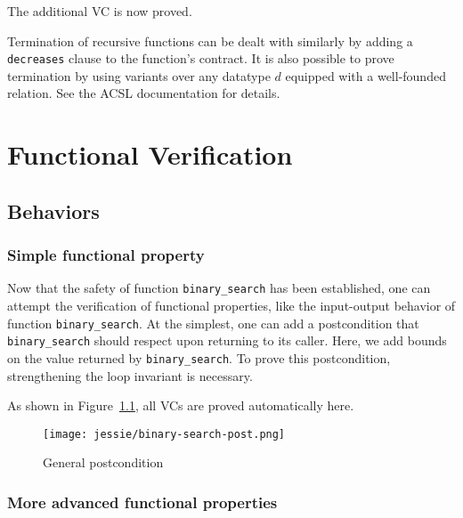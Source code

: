 \documentclass[a4paper,11pt,twoside,openright]{report}
\newcommand{\negtenthspace}{\hspace*{-0.1\linewidth}}
\begin{document}
The additional VC is now proved.

Termination of recursive functions can be dealt with similarly by
adding a \texttt{decreases} clause to the function's contract. 
It is also possible to prove termination by using variants over 
any datatype $d$ equipped with a well-founded relation. 
See the ACSL documentation for details.




\chapter{Functional Verification}


\section{Behaviors}

\subsection{Simple functional property}

Now that the safety of function \verb|binary_search| has been established, one
can attempt the verification of functional properties, like the
input-output behavior of function \verb|binary_search|. At the
simplest, one can add a postcondition that \verb|binary_search| should
respect upon returning to its caller. Here, we add bounds on the value
returned by \verb|binary_search|. To prove this postcondition,
strengthening the loop invariant is necessary.



As shown in Figure~\ref{fig:post}, all VCs are proved automatically here.

\begin{figure}[t]
  \begin{center}
    \negtenthspace\texttt{[image: jessie/binary-search-post.png]}
  \end{center}
  \caption{General postcondition}
  \label{fig:post}
  \hrulefill
\end{figure}

\subsection{More advanced functional properties}
\end{document}
